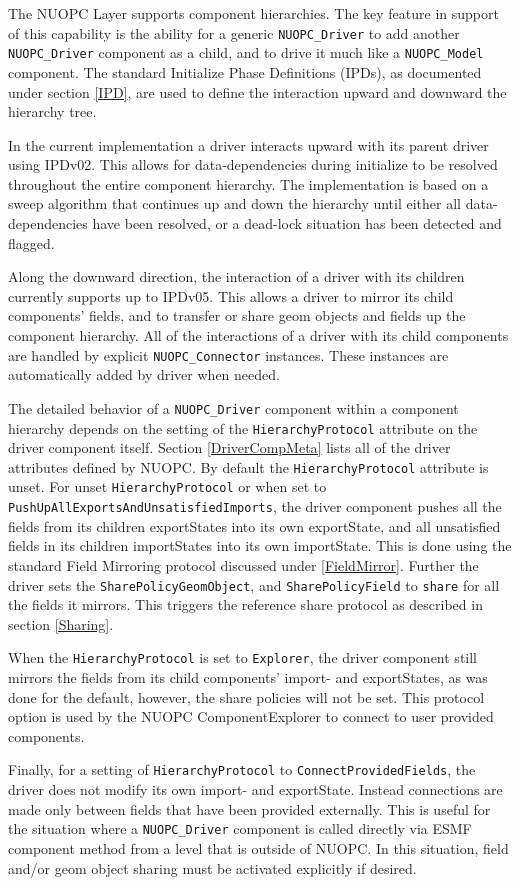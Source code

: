 %

\label{ComponentHierarchy}

The NUOPC Layer supports component hierarchies. The key feature in support of this capability is the ability for a generic {\tt NUOPC\_Driver} to add another {\tt NUOPC\_Driver} component as a child, and to drive it much like a {\tt NUOPC\_Model} component. The standard Initialize Phase Definitions (IPDs), as documented under section \ref{IPD}, are used to define the interaction upward and downward the hierarchy tree.

In the current implementation a driver interacts upward with its parent driver using IPDv02. This allows for data-dependencies during initialize to be resolved throughout the entire component hierarchy. The implementation is based on a sweep algorithm that continues up and down the hierarchy until either all data-dependencies have been resolved, or a dead-lock situation has been detected and flagged.

Along the downward direction, the interaction of a driver with its children currently supports up to IPDv05. This allows a driver to mirror its child components' fields, and to transfer or share geom objects and fields up the component hierarchy. All of the interactions of a driver with its child components are handled by explicit {\tt NUOPC\_Connector} instances. These instances are automatically added by driver when needed.

The detailed behavior of a {\tt NUOPC\_Driver} component within a component hierarchy depends on the setting of the {\tt HierarchyProtocol} attribute on the driver component itself. Section \ref{DriverCompMeta} lists all of the driver attributes defined by NUOPC. By default the {\tt HierarchyProtocol} attribute is unset. For unset {\tt HierarchyProtocol} or when set to {\tt PushUpAllExportsAndUnsatisfiedImports}, the driver component pushes all the fields from its children exportStates into its own exportState, and all unsatisfied fields in its children importStates into its own importState. This is done using the standard Field Mirroring protocol discussed under \ref{FieldMirror}. Further the driver sets the {\tt SharePolicyGeomObject}, and 
{\tt SharePolicyField} to {\tt share} for all the fields it mirrors. This triggers the reference share protocol as described in section \ref{Sharing}.

When the {\tt HierarchyProtocol} is set to {\tt Explorer}, the driver component still mirrors the fields from its child components' import- and exportStates, as was done for the default, however, the share policies will not be set. This protocol option is used by the NUOPC ComponentExplorer to connect to user provided components.

Finally, for a setting of {\tt HierarchyProtocol} to {\tt ConnectProvidedFields}, the
driver does not modify its own import- and exportState. Instead connections are made only between fields that have been provided externally. This is useful for the situation where a {\tt NUOPC\_Driver} component is called directly via ESMF component method from a level that is outside of NUOPC. In this situation, field and/or geom object sharing must be activated explicitly if desired.

